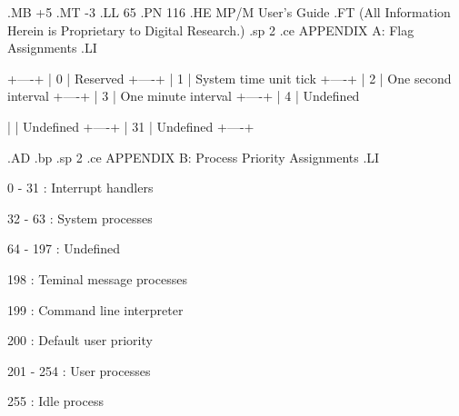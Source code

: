 .MB +5
.MT -3
.LL 65
.PN 116
.HE MP/M User's Guide
.FT   (All Information Herein is Proprietary to Digital Research.)
.sp 2
.ce
APPENDIX A:  Flag Assignments
.LI


	+----+
	|  0 |   Reserved
	+----+
	|  1 |   System time unit tick
	+----+
	|  2 |   One second interval
	+----+
	|  3 |   One minute interval
	+----+
	|  4 |   Undefined

	|    |   Undefined
	+----+
	| 31 |   Undefined
	+----+

.AD
.bp
.sp 2
.ce
APPENDIX B:  Process Priority Assignments
.LI

	  0 -  31 : Interrupt handlers

	 32 -  63 : System processes

	 64 - 197 : Undefined

	      198 : Teminal message processes

	      199 : Command line interpreter

	      200 : Default user priority

	201 - 254 : User processes

	      255 : Idle process

